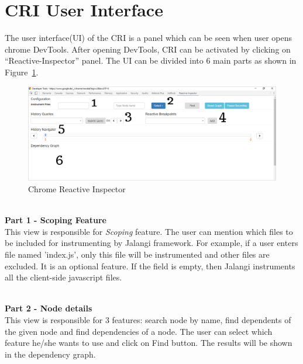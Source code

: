 \section{CRI User Interface} \label{section:cri-ui}
The user interface(UI) of the CRI is a panel which can be seen when user opens chrome DevTools. After opening DevTools, CRI can be activated by clicking on ``Reactive-Inspector'' panel. The UI can be divided into 6 main parts as shown in Figure~\ref{fig:cri}. 

\begin{figure}[!h]
	\centering
	\includegraphics[scale=0.5,trim=0 0 0 0]{images/cri.png}
	\caption{Chrome Reactive Inspector}
	\label{fig:cri}
\end{figure}

\leavevmode
\\
\textbf{Part 1 - Scoping Feature}
\\
This view is responsible for \textit{Scoping} feature. The user can mention which files to be included for instrumenting by Jalangi framework. For example, if a user enters file named 'index.js', only this file will be instrumented and other files are excluded. It is an optional feature. If the field is empty, then Jalangi instruments all the client-side javascript files. 

\leavevmode
\\
\textbf{Part 2 - Node details}
\\
This view is responsible for 3 features: search node by name, find dependents of the given node and find dependencies of a node. The user can select which feature he/she wants to use and click on Find button. 
The results will be shown in the dependency graph. 

